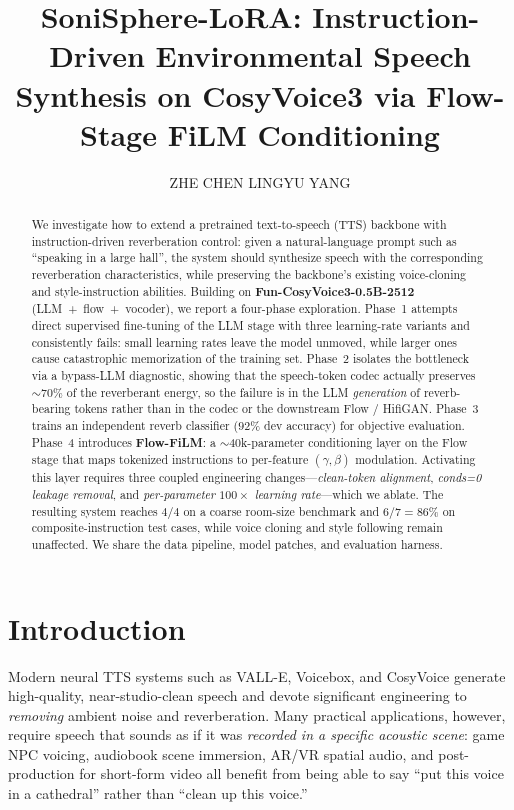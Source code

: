 \documentclass{article}
\title{SoniSphere-LoRA: Instruction-Driven Environmental Speech Synthesis on
CosyVoice3 via Flow-Stage FiLM Conditioning}
\author{ZHE CHEN \quad LINGYU YANG}
\begin{document}
\maketitle

\begin{abstract}
We investigate how to extend a pretrained text-to-speech (TTS) backbone with
instruction-driven reverberation control: given a natural-language prompt such as
``speaking in a large hall'', the system should synthesize speech with
the corresponding reverberation characteristics, while preserving the
backbone's existing voice-cloning and style-instruction abilities. Building on
\textbf{Fun-CosyVoice3-0.5B-2512} (LLM~+~flow~+~vocoder), we report a four-phase
exploration. Phase~1 attempts direct supervised fine-tuning of the LLM stage with
three learning-rate variants and consistently fails: small learning rates leave
the model unmoved, while larger ones cause catastrophic memorization of the
training set. Phase~2 isolates the bottleneck via a bypass-LLM diagnostic,
showing that the speech-token codec actually preserves $\sim 70\%$ of the reverberant
energy, so the failure is in the LLM \emph{generation} of reverb-bearing tokens
rather than in the codec or the downstream Flow / HifiGAN. Phase~3 trains an
independent reverb classifier ($92\%$ dev accuracy) for objective evaluation.
Phase~4 introduces \textbf{Flow-FiLM}: a $\sim$40k-parameter conditioning layer
on the Flow stage that maps tokenized instructions to per-feature
$(\gamma,\beta)$ modulation. Activating this layer requires three coupled
engineering changes---\emph{clean-token alignment}, \emph{conds=0
leakage removal}, and \emph{per-parameter $100\times$ learning rate}---which we
ablate. The resulting system reaches $4/4$ on a coarse room-size benchmark and
$6/7=86\%$ on composite-instruction test cases, while voice cloning and
style following remain unaffected. We share the data pipeline, model patches,
and evaluation harness.
\end{abstract}

\section{Introduction}

Modern neural TTS systems such as VALL-E, Voicebox, and CosyVoice generate
high-quality, near-studio-clean speech and devote significant engineering to
\emph{removing} ambient noise and reverberation. Many practical applications,
however, require speech that sounds as if it was \emph{recorded in a specific
acoustic scene}: game NPC voicing, audiobook scene immersion, AR/VR spatial
audio, and post-production for short-form video all benefit from being able to
say ``put this voice in a cathedral'' rather than ``clean up this voice.''
\end{document}
